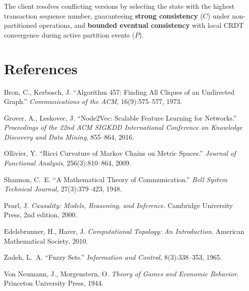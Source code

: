 \documentclass[11pt,a4paper]{article}
\theoremstyle{definition}
\numberwithin{equation}{section}
\begin{document}
The client resolves conflicting versions by selecting the state with the highest transaction sequence number, guaranteeing \textbf{strong consistency} ($C$) under non-partitioned operations, and \textbf{bounded eventual consistency} with local CRDT convergence during active partition events ($P$).


\newpage
\section*{References}

\begin{enumerate}[label={[\arabic*]}, leftmargin=2.5em, itemsep=0.3em]
    \item Bron, C., Kerbosch, J. ``Algorithm 457: Finding All Cliques of an Undirected Graph.'' \textit{Communications of the ACM}, 16(9):575--577, 1973.

    \item Grover, A., Leskovec, J. ``Node2Vec: Scalable Feature Learning for Networks.'' \textit{Proceedings of the 22nd ACM SIGKDD International Conference on Knowledge Discovery and Data Mining}, 855--864, 2016.

    \item Ollivier, Y. ``Ricci Curvature of Markov Chains on Metric Spaces.'' \textit{Journal of Functional Analysis}, 256(3):810--864, 2009.

    \item Shannon, C.~E. ``A Mathematical Theory of Communication.'' \textit{Bell System Technical Journal}, 27(3):379--423, 1948.

    \item Pearl, J. \textit{Causality: Models, Reasoning, and Inference}. Cambridge University Press, 2nd edition, 2000.

    \item Edelsbrunner, H., Harer, J. \textit{Computational Topology: An Introduction}. American Mathematical Society, 2010.

    \item Zadeh, L.~A. ``Fuzzy Sets.'' \textit{Information and Control}, 8(3):338--353, 1965.

    \item Von Neumann, J., Morgenstern, O. \textit{Theory of Games and Economic Behavior}. Princeton University Press, 1944.
\end{enumerate}

\end{document}
